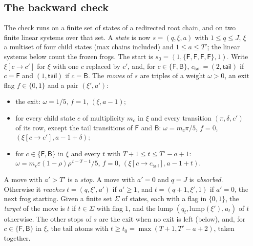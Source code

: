 \documentclass[11pt]{amsart}
\theoremstyle{definition}
\numberwithin{equation}{section}
\newcommand{\eps}{\varepsilon}
\begin{document}
\subsection{The backward check}
The check runs on a finite set of states of a redirected root chain, and on two finite linear systems over that set. A \emph{state} is now $s=(q,\xi,a)$ with $1\le q\le J$, $\xi$ a multiset of four child states (max chains included) and $1\le a\le T'$; the linear systems below count the frozen frogs. The start is $s_0=(1,\{\mathsf F,\mathsf F,\mathsf F,\mathsf F\},1)$. Write $\xi[c\to c']$ for $\xi$ with one $c$ replaced by $c'$, and, for $c\in\{\mathsf F,\mathsf B\}$, $c_{\mathsf{tail}}=(2,\mathsf{tail})$ if $c=\mathsf F$ and $(1,\mathsf{tail})$ if $c=\mathsf B$. The \emph{moves} of $s$ are triples of a weight $\omega>0$, an exit flag $f\in\{0,1\}$ and a pair $(\xi',a')$:
\begin{itemize}
\item the exit: $\omega=1/5$, $f=1$, $(\xi,a-1)$;
\item for every child state $c$ of multiplicity $m_c$ in $\xi$ and every transition $(\pi,\delta,c')$ of its row, except the tail transitions of $\mathsf F$ and $\mathsf B$: $\omega=m_c\pi/5$, $f=0$, $(\xi[c\to c'],a-1+\delta)$;
\item for $c\in\{\mathsf F,\mathsf B\}$ in $\xi$ and every $t$ with $T+1\le t\le T'-a+1$: $\omega=m_c\eps(1-\rho)\rho^{\,t-T-1}/5$, $f=0$, $(\xi[c\to c_{\mathsf{tail}}],a-1+t)$.
\end{itemize}
A move with $a'>T'$ is a \emph{stop}. A move with $a'=0$ and $q=J$ is \emph{absorbed}. Otherwise it \emph{reaches} $t=(q,\xi',a')$ if $a'\ge1$, and $t=(q+1,\xi',1)$ if $a'=0$, the next frog starting. Given a finite set $\Sigma$ of states, each with a flag in $\{0,1\}$, the \emph{target} of the move is $t$ if $t\in\Sigma$ with flag $1$, and the lump $(q_t,\mathrm{lump}(\xi'),a_t)$ of $t$ otherwise. The other stops of $s$ are the exit when no exit is left (below), and, for $c\in\{\mathsf F,\mathsf B\}$ in $\xi$, the tail atoms with $t\ge t_0=\max(T+1,T'-a+2)$, taken together.
\end{document}
